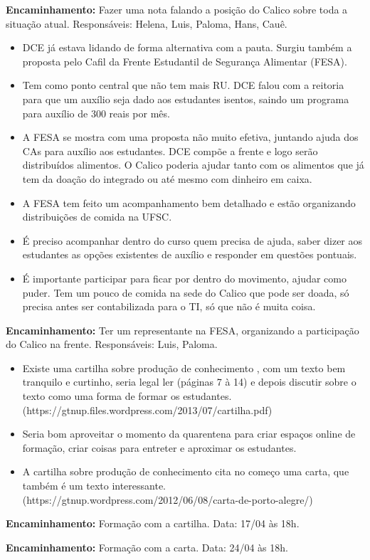 \documentclass{ata-calico}
\begin{document}
\textbf{Encaminhamento:} Fazer uma nota falando a posição do Calico sobre toda a situação atual. Responsáveis: Helena, Luis, Paloma, Hans, Cauê.

\begin{itemize}
\item DCE já estava lidando de forma alternativa com a pauta. Surgiu também a proposta pelo Cafil da Frente Estudantil de Segurança Alimentar (FESA).
\item Tem como ponto central que não tem mais RU. DCE falou com a reitoria para que um auxílio seja dado aos estudantes isentos, saindo um programa para auxílio de 300 reais por mês.
\item A FESA se mostra com uma proposta não muito efetiva, juntando ajuda dos CAs para auxílio aos estudantes. DCE compõe a frente e logo serão distribuídos alimentos. O Calico poderia ajudar tanto com os alimentos que já tem da doação do integrado ou até mesmo com dinheiro em caixa.
\item A FESA tem feito um acompanhamento bem detalhado e estão organizando distribuições de comida na UFSC.
\item É preciso acompanhar dentro do curso quem precisa de ajuda, saber dizer aos estudantes as opções existentes de auxílio e responder em questões pontuais.
\item É importante participar para ficar por dentro do movimento, ajudar como puder. Tem um pouco de comida na sede do Calico que pode ser doada, só precisa antes ser contabilizada para o TI, só que não é muita coisa.
\end{itemize}

\textbf{Encaminhamento:} Ter um representante na FESA, organizando a participação do Calico na frente. Responsáveis: Luis, Paloma.

\begin{itemize}
\item Existe uma cartilha sobre produção de conhecimento , com um texto bem tranquilo e curtinho, seria legal ler (páginas 7 à 14) e depois discutir sobre o texto como uma forma de formar os estudantes. (https://gtnup.files.wordpress.com/2013/07/cartilha.pdf)
\item Seria bom aproveitar o momento da quarentena para criar espaços online de formação, criar coisas para entreter e aproximar os estudantes.
\item A cartilha sobre produção de conhecimento cita no começo uma carta, que também é um texto interessante. (https://gtnup.wordpress.com/2012/06/08/carta-de-porto-alegre/)
\end{itemize}

\textbf{Encaminhamento:} Formação com a cartilha. Data: 17/04 às 18h.

\textbf{Encaminhamento:} Formação com a carta. Data: 24/04 às 18h.

\end{document}

